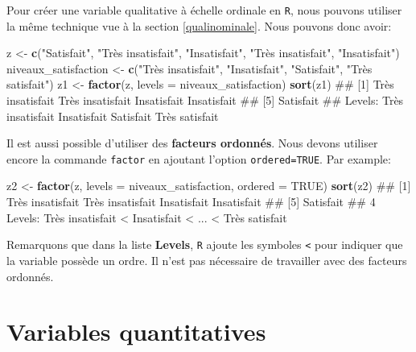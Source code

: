 \documentclass[]{book}
\newenvironment{Shaded}{\begin{snugshade}}{\end{snugshade}}
\newcommand{\DataTypeTok}[1]{\textcolor[rgb]{0.13,0.29,0.53}{#1}}
\newcommand{\KeywordTok}[1]{\textcolor[rgb]{0.13,0.29,0.53}{\textbf{#1}}}
\newcommand{\NormalTok}[1]{#1}
\newcommand{\OtherTok}[1]{\textcolor[rgb]{0.56,0.35,0.01}{#1}}
\newcommand{\StringTok}[1]{\textcolor[rgb]{0.31,0.60,0.02}{#1}}
\theoremstyle{definition}
\theoremstyle{definition}
\theoremstyle{definition}
\theoremstyle{remark}
\begin{document}
Pour créer une variable qualitative à échelle ordinale en \texttt{R},
nous pouvons utiliser la même technique vue à la section
\ref{qualinominale}. Nous pouvons donc avoir:

\begin{Shaded}
\begin{Highlighting}[]
\NormalTok{z <-}\StringTok{ }\KeywordTok{c}\NormalTok{(}\StringTok{"Satisfait"}\NormalTok{, }\StringTok{"Très insatisfait"}\NormalTok{, }\StringTok{"Insatisfait"}\NormalTok{, }\StringTok{"Très insatisfait"}\NormalTok{, }\StringTok{"Insatisfait"}\NormalTok{)}
\NormalTok{niveaux_satisfaction <-}\StringTok{ }\KeywordTok{c}\NormalTok{(}\StringTok{"Très insatisfait"}\NormalTok{, }\StringTok{"Insatisfait"}\NormalTok{, }\StringTok{"Satisfait"}\NormalTok{, }\StringTok{"Très satisfait"}\NormalTok{)}
\NormalTok{z1 <-}\StringTok{ }\KeywordTok{factor}\NormalTok{(z, }\DataTypeTok{levels =}\NormalTok{ niveaux_satisfaction)}
\KeywordTok{sort}\NormalTok{(z1)}
\NormalTok{## [1] Très insatisfait Très insatisfait Insatisfait      Insatisfait     }
\NormalTok{## [5] Satisfait       }
\NormalTok{## Levels: Très insatisfait Insatisfait Satisfait Très satisfait}
\end{Highlighting}
\end{Shaded}

Il est aussi possible d'utiliser des \textbf{facteurs ordonnés}. Nous
devons utiliser encore la commande \texttt{factor} en ajoutant l'option
\texttt{ordered=TRUE}. Par example:

\begin{Shaded}
\begin{Highlighting}[]
\NormalTok{z2 <-}\StringTok{ }\KeywordTok{factor}\NormalTok{(z, }\DataTypeTok{levels =}\NormalTok{ niveaux_satisfaction, }\DataTypeTok{ordered =} \OtherTok{TRUE}\NormalTok{)}
\KeywordTok{sort}\NormalTok{(z2)}
\NormalTok{## [1] Très insatisfait Très insatisfait Insatisfait      Insatisfait     }
\NormalTok{## [5] Satisfait       }
\NormalTok{## 4 Levels: Très insatisfait < Insatisfait < ... < Très satisfait}
\end{Highlighting}
\end{Shaded}

Remarquons que dans la liste \textbf{Levels}, \texttt{R} ajoute les
symboles \texttt{\textless{}} pour indiquer que la variable possède un
ordre. Il n'est pas nécessaire de travailler avec des facteurs ordonnés.

\hypertarget{variables-quantitatives}{%
\section{Variables quantitatives}\label{variables-quantitatives}}
\end{document}
